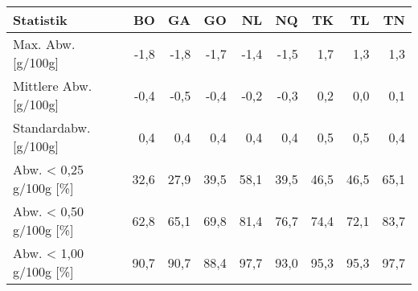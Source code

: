 \begin{tabular}{lrrrrrrrr}
\toprule
             Statistik &   BO &   GA &   GO &   NL &   NQ &   TK &   TL &   TN \\
\midrule
    Max. Abw. [g/100g] & -1,8 & -1,8 & -1,7 & -1,4 & -1,5 &  1,7 &  1,3 &  1,3 \\
Mittlere Abw. [g/100g] & -0,4 & -0,5 & -0,4 & -0,2 & -0,3 &  0,2 &  0,0 &  0,1 \\
Standardabw. [g/100g]  &  0,4 &  0,4 &  0,4 &  0,4 &  0,4 &  0,5 &  0,5 &  0,4 \\
Abw. < 0,25 g/100g [\%] & 32,6 & 27,9 & 39,5 & 58,1 & 39,5 & 46,5 & 46,5 & 65,1 \\
Abw. < 0,50 g/100g [\%] & 62,8 & 65,1 & 69,8 & 81,4 & 76,7 & 74,4 & 72,1 & 83,7 \\
Abw. < 1,00 g/100g [\%] & 90,7 & 90,7 & 88,4 & 97,7 & 93,0 & 95,3 & 95,3 & 97,7 \\
\bottomrule
\end{tabular}
